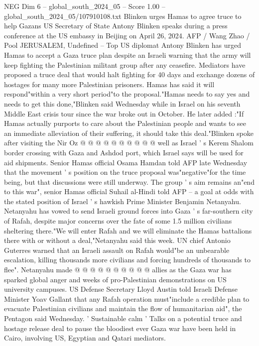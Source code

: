 \begin{textsample}{NEG Dim 6 – global\_south\_2024\_05 – Score 1.00 – global\_south\_2024\_05/107910108.txt}  \label{ex:f6_neg_243}
Blinken urges Hamas to agree truce to help Gazans US Secretary of State Antony Blinken speaks during a press conference at the US embassy in Beijing on April 26, 2024.
AFP / Wang Zhao / Pool JERUSALEM, Undefined -- Top US diplomat Antony Blinken has urged Hamas to accept a Gaza truce plan despite an Israeli warning that the army will keep fighting the Palestinian militant group after any ceasefire.
Mediators have proposed a truce deal that would halt fighting for 40 days and exchange dozens of hostages for many more Palestinian prisoners.
Hamas has said it will respond"within a very short period"to the proposal."Hamas needs to say yes and needs to get this done,"Blinken said Wednesday while in Israel on his seventh Middle East crisis tour since the war broke out in October.
He later added :"If Hamas actually purports to care about the Palestinian people and wants to see an immediate alleviation of their suffering, it should take this deal."Blinken spoke after visiting the Nir Oz @ @ @ @ @ @ @ @ @ @ well as Israel ' s Kerem Shalom border crossing with Gaza and Ashdod port, which Israel says will be used for aid shipments.
Senior Hamas official Osama Hamdan told AFP late Wednesday that the movement ' s position on the truce proposal was"negative"for the time being, but that discussions were still underway.
The group ' s aim remains an"end to this war", senior Hamas official Suhail al-Hindi told AFP -- a goal at odds with the stated position of Israel ' s hawkish Prime Minister Benjamin Netanyahu.
Netanyahu has vowed to send Israeli ground forces into Gaza ' s far-southern city of Rafah, despite major concerns over the fate of some 1.5 million civilians sheltering there."We will enter Rafah and we will eliminate the Hamas battalions there with or without a deal,"Netanyahu said this week.
UN chief Antonio Guterres warned that an Israeli assault on Rafah would"be an unbearable escalation, killing thousands more civilians and forcing hundreds of thousands to flee".
Netanyahu made @ @ @ @ @ @ @ @ @ @ allies as the Gaza war has sparked global anger and weeks of pro-Palestinian demonstrations on US university campuses.
US Defense Secretary Lloyd Austin told Israeli Defense Minister Yoav Gallant that any Rafah operation must"include a credible plan to evacuate Palestinian civilians and maintain the flow of humanitarian aid", the Pentagon said Wednesday. ' Sustainable calm ' Talks on a potential truce and hostage release deal to pause the bloodiest ever Gaza war have been held in Cairo, involving US, Egyptian and Qatari mediators.

\end{textsample}
